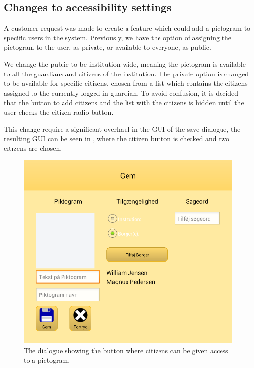 \subsection{Changes to accessibility settings}
A customer request was made to create a feature which could add a pictogram to specific users in the system. 
Previously, we have the option of assigning the pictogram to the user, as private, or available to everyone, as public.

We change the public to be institution wide, meaning the pictogram is available to all the guardians and citizens of the institution.
The private option is changed to be available for specific citizens, chosen from a list which contains the citizens assigned to the currently logged in guardian.
To avoid confusion, it is decided that the button to add citizens and the list with the citizens is hidden until the user checks the citizen radio button.

This change require a significant overhaul in the GUI of the save dialogue, the resulting GUI can be seen in , where the citizen button is checked and two citizens are chosen.

\begin{figure}[h]
	\centering
	\includegraphics[scale=0.5]{media/sprint4/save_dialog2}
	\caption{The dialogue showing the button where citizens can be given access to a pictogram.}
	\label{fig:save_dialogue2}
\end{figure}

